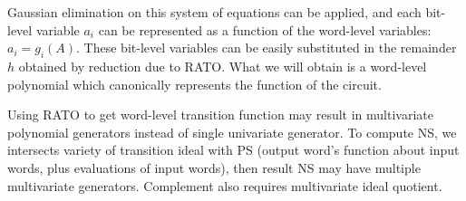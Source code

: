 Gaussian elimination on this system of equations can be 
applied, and each bit-level variable $a_i$ can be represented as a
function of the word-level variables: $a_i = g_i(A)$. These bit-level
variables can be easily substituted in the remainder $h$ obtained by
reduction due to RATO. What we will obtain is a word-level polynomial
 which canonically represents the function of the circuit.  


Using RATO to get word-level transition function may result in multivariate polynomial generators
instead of single univariate generator. To compute NS, we intersects variety of transition ideal 
with PS (output word's function about input words, plus
evaluations of input words), then result NS may have multiple multivariate generators. 
Complement also requires multivariate ideal quotient.

